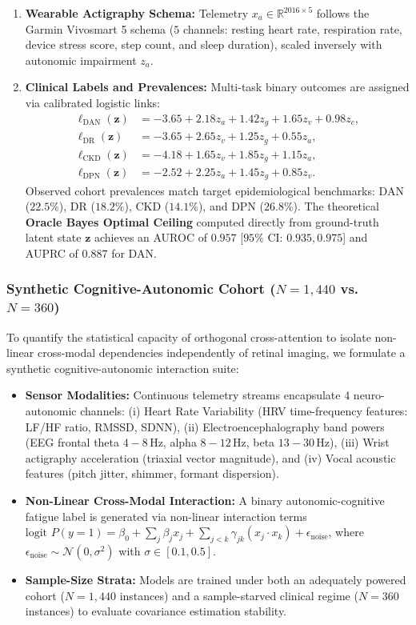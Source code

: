\documentclass[journal,10pt,twocolumn]{IEEEtran}
\begin{document}
\begin{enumerate}
    \item \textbf{Wearable Actigraphy Schema:} Telemetry $x_a \in \mathbb{R}^{2016 \times 5}$ follows the Garmin Vivosmart 5 schema ($5$ channels: resting heart rate, respiration rate, device stress score, step count, and sleep duration), scaled inversely with autonomic impairment $z_a$.
    \item \textbf{Clinical Labels and Prevalences:} Multi-task binary outcomes are assigned via calibrated logistic links:
    \begin{align}
        \ell_{\text{DAN}}(\mathbf{z}) &= -3.65 + 2.18 z_a + 1.42 z_g + 1.65 z_v + 0.98 z_c, \\
        \ell_{\text{DR}}(\mathbf{z})  &= -3.65 + 2.65 z_v + 1.25 z_g + 0.55 z_a, \\
        \ell_{\text{CKD}}(\mathbf{z}) &= -4.18 + 1.65 z_v + 1.85 z_g + 1.15 z_a, \\
        \ell_{\text{DPN}}(\mathbf{z}) &= -2.52 + 2.25 z_a + 1.45 z_g + 0.85 z_v.
    \end{align}
    Observed cohort prevalences match target epidemiological benchmarks: DAN ($22.5\%$), DR ($18.2\%$), CKD ($14.1\%$), and DPN ($26.8\%$). The theoretical \textbf{Oracle Bayes Optimal Ceiling} computed directly from ground-truth latent state $\mathbf{z}$ achieves an AUROC of $0.957$ [$95\%$ CI: $0.935, 0.975$] and AUPRC of $0.887$ for DAN.
\end{enumerate}

\subsubsection{Synthetic Cognitive-Autonomic Cohort (\texorpdfstring{$N=1{,}440$ vs. $N=360$}{N=1440 vs. N=360})}
To quantify the statistical capacity of orthogonal cross-attention to isolate non-linear cross-modal dependencies independently of retinal imaging, we formulate a synthetic cognitive-autonomic interaction suite:
\begin{itemize}
    \item \textbf{Sensor Modalities:} Continuous telemetry streams encapsulate 4 neuro-autonomic channels: (i) Heart Rate Variability (HRV time-frequency features: LF/HF ratio, RMSSD, SDNN), (ii) Electroencephalography band powers (EEG frontal theta $4-8$\,Hz, alpha $8-12$\,Hz, beta $13-30$\,Hz), (iii) Wrist actigraphy acceleration (triaxial vector magnitude), and (iv) Vocal acoustic features (pitch jitter, shimmer, formant dispersion).
    \item \textbf{Non-Linear Cross-Modal Interaction:} A binary autonomic-cognitive fatigue label is generated via non-linear interaction terms $\text{logit } P(y=1) = \beta_0 + \sum_j \beta_j x_j + \sum_{j < k} \gamma_{jk} (x_j \cdot x_k) + \epsilon_{\text{noise}}$, where $\epsilon_{\text{noise}} \sim \mathcal{N}(0, \sigma^2)$ with $\sigma \in [0.1, 0.5]$.
    \item \textbf{Sample-Size Strata:} Models are trained under both an adequately powered cohort ($N=1{,}440$ instances) and a sample-starved clinical regime ($N=360$ instances) to evaluate covariance estimation stability.
\end{itemize}
\end{document}
